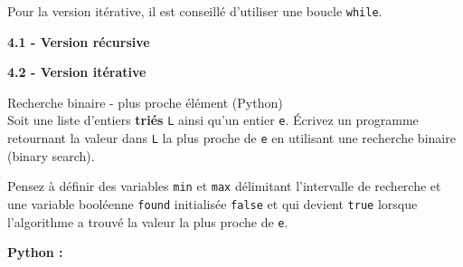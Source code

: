 \begin{Exercice}[20 minutes]
\begin{conseil}
        Pour la version itérative, il est conseillé d'utiliser une boucle \lstinline{while}.

    \end{conseil}

    \begin{solution}
        \textbf{4.1 - Version récursive}
        
    \end{solution}
    \begin{solution}
        \textbf{4.2 - Version itérative}
        
    \end{solution}

\end{Exercice}


\begin{Exercice}[15 minutes] Recherche binaire - plus proche élément (Python)\\

Soit une liste d’entiers \textbf{triés} \lstinline{L} ainsi qu’un entier \lstinline{e}. Écrivez un programme retournant la valeur dans \lstinline{L} la plus proche de \lstinline{e} en utilisant une recherche binaire (binary search).\\



\begin{conseil}
    Pensez à définir des variables \lstinline{min} et \lstinline{max} délimitant l'intervalle de recherche et une variable booléenne \lstinline{found} initialisée \lstinline{false} et qui devient \lstinline{true} lorsque l'algorithme a trouvé la valeur la plus proche de \lstinline{e}. 
    
\end{conseil}

    \begin{solution}
        \textbf{Python :}
        
    \end{solution}

\end{Exercice}


